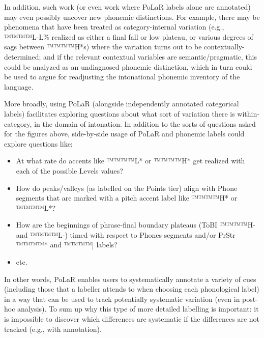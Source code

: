 \documentclass[11pt, twoside]{memoir}
\begin{document}
In addition, such work (or even work where PoLaR labels alone are annotated) may even possibly uncover new phonemic distinctions. For example, there may be phenomena that have been treated as category-internal variation (e.g., ™™™™{L-L\%} realized as either a final fall or low plateau, or various degrees of sags between ™™™™{H*}s) where the variation turns out to be contextually-determined; and if the relevant contextual variables are semantic\slash pragmatic, this could be analyzed as an undiagnosed phonemic distinction, which in turn could be used to argue for readjusting the intonational phonemic inventory of the language.

More broadly, using PoLaR (alongside independently annotated categorical labels) facilitates exploring questions about what sort of variation there is within-category, in the domain of intonation. In addition to the sorts of questions asked for the figures above, side-by-side usage of PoLaR and phonemic labels could explore questions like:

\begin{itemize}
	\item At what rate do accents like ™™™™{L*} or ™™™™{H*} get realized with each of the possible Levels values?
	\item How do peaks\slash valleys (as labelled on the Points tier) align with Phone segments that are marked with a pitch accent label like ™™™™{H*} or ™™™™{L*}?
	\item How are the beginnings of phrase-final boundary plateaus (ToBI ™™™™{H-} and ™™™™{L-}) timed with respect to Phones segments and/or PrStr ™™™™{*} and ™™™™{]} labels?
	\item etc.
\end{itemize}

In other words, PoLaR enables users to systematically annotate a variety of cues (including those that a labeller attends to when choosing each phonological label) in a way that can be used to track potentially systematic variation (even in post-hoc analysis). To sum up why this type of more detailed labelling is important: it is impossible to discover which differences are systematic if the differences are not tracked (e.g., with annotation).
\end{document}
